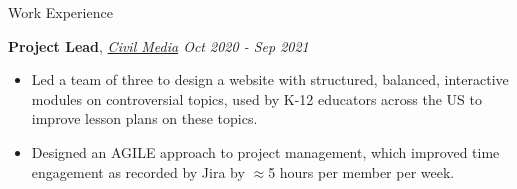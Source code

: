 \documentclass{resume}
\begin{document}
\begin{rSection}{Work Experience}
    
    {\bf Project Lead}, {\em \href{https://civilmedia.webflow.io/}{Civil Media} \hfill Oct 2020 - Sep 2021}
    \vspace{-6pt}
    \begin{itemize}[nosep]
        \item Led a team of three to design a website with structured, balanced, interactive modules on controversial topics, used by K-12 educators across the US to improve lesson plans on these topics.
        \item Designed an AGILE approach to project management, which improved time engagement as recorded by Jira by $\approx$5 hours per member per week.
    \end{itemize}



\end{rSection}
\end{document}
